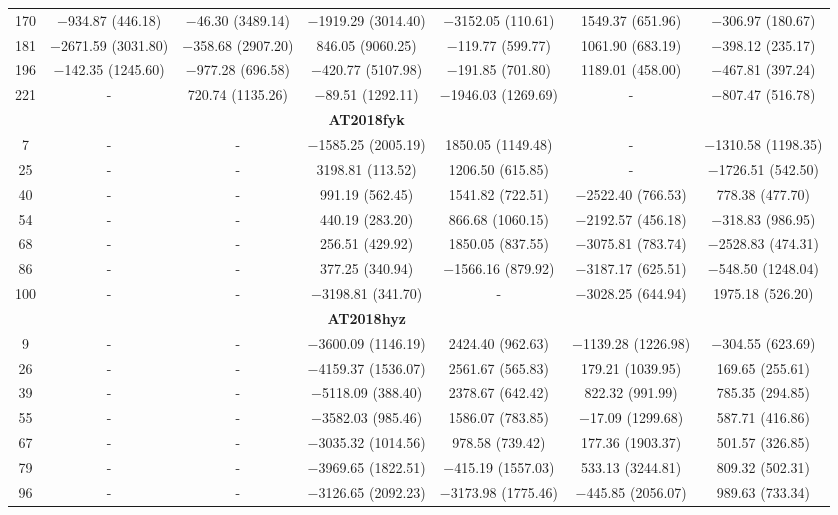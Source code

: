 \documentclass[structabstract]{aa}
\begin{document}
\begin{small}
\begin{longtable}{c c c c c c c}
170	&	$-$934.87 (446.18)	&	$-$46.30 (3489.14)	&	$-$1919.29 (3014.40)	&	$-$3152.05 (110.61)	&	1549.37 (651.96)	&	$-$306.97 (180.67)  \\
181	&	$-$2671.59 (3031.80)	&	$-$358.68 (2907.20)	&	846.05 (9060.25)	&	$-$119.77 (599.77)	&	1061.90 (683.19)	&	$-$398.12 (235.17)  \\
196	&	$-$142.35 (1245.60)	&	$-$977.28 (696.58)	&	$-$420.77 (5107.98)	&	$-$191.85 (701.80)	&	1189.01 (458.00)	&	$-$467.81 (397.24)  \\
221	&	-	&	720.74 (1135.26)	&	$-$89.51 (1292.11)	&	$-$1946.03 (1269.69)	&	-	&	$-$807.47 (516.78)  \\ \hline
	&		&		&	\textbf{AT2018fyk}	&		&		&	\\ \hline
7	&	-	&	-	&	$-$1585.25 (2005.19)	&	1850.05 (1149.48)	&	-	&	$-$1310.58 (1198.35)  \\
25	&	-	&	-	&	3198.81 (113.52)	&	1206.50 (615.85)	&	-	&	$-$1726.51 (542.50)  \\
40	&	-	&	-	&	991.19 (562.45)	&	1541.82 (722.51)	&	$-$2522.40 (766.53)	&	778.38 (477.70)  \\
54	&	-	&	-	&	440.19 (283.20)	&	866.68 (1060.15)	&	$-$2192.57 (456.18)	&	$-$318.83 (986.95)  \\
68	&	-	&	-	&	256.51 (429.92)	&	1850.05 (837.55)	&	$-$3075.81 (783.74)	&	$-$2528.83 (474.31)  \\
86	&	-	&	-	&	377.25 (340.94)	&	$-$1566.16 (879.92)	&	$-$3187.17 (625.51)	&	$-$548.50 (1248.04)  \\
100	&	-	&	-	&	$-$3198.81 (341.70)	&	-	&	$-$3028.25 (644.94)	&	1975.18 (526.20)  \\ \hline
	&		&		&	\textbf{AT2018hyz}			&		&	\\ \hline
9	&	-	&	-	&	$-$3600.09 (1146.19)	&	2424.40 (962.63)	&	$-$1139.28 (1226.98)	&	$-$304.55 (623.69)  \\
26	&	-	&	-	&	$-$4159.37 (1536.07)	&	2561.67 (565.83)	&	179.21 (1039.95)	&	169.65 (255.61)  \\
39	&	-	&	-	&	$-$5118.09 (388.40)	&	2378.67 (642.42)	&	822.32 (991.99)	&	785.35 (294.85)  \\
55	&	-	&	-	&	$-$3582.03 (985.46)	&	1586.07 (783.85)	&	$-$17.09 (1299.68)	&	587.71 (416.86)  \\
67	&	-	&	-	&	$-$3035.32 (1014.56)	&	978.58 (739.42)	&	177.36 (1903.37)	&	501.57 (326.85)  \\
79	&	-	&	-	&	$-$3969.65 (1822.51)	&	$-$415.19 (1557.03)	&	533.13 (3244.81)	&	809.32 (502.31)  \\
96	&	-	&	-	&	$-$3126.65 (2092.23)	&	$-$3173.98 (1775.46)	&	$-$445.85 (2056.07)	&	989.63 (733.34)  \\

\end{longtable}
\end{small}
\end{document}
